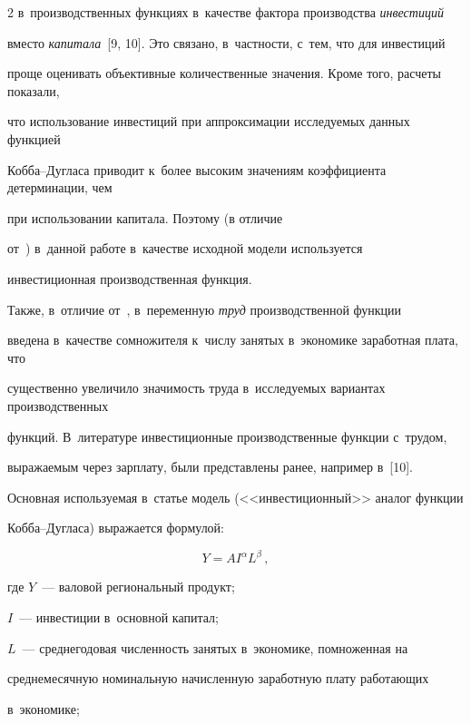 \begin{multicols}{2}
в~производственных функциях в~качестве фактора производства \textit{инвестиций} 


вместо \textit{капитала}~[9, 10]. Это связано, в~част\-ности, с~тем, что для инвестиций 


проще оценивать объективные количественные значения. Кроме того, расчеты показали, 


что использование ин\-вес\-ти\-ций при аппроксимации исследуемых данных функцией 


Коб\-ба--Дуг\-ла\-са приводит к~более высоким значениям коэффициента детерминации, чем 


при использовании капитала. Поэтому (в отличие


 от~\cite{7-ki, 8-ki}) в~данной работе в~качестве исходной модели используется 


инвестиционная производственная функция. 


  


  Также, в~отличие от~\cite{7-ki, 8-ki}, в~переменную \textit{труд} производственной функции 


введена в~качестве сомножителя к~числу занятых в~экономике заработная плата, что 


существенно увеличило значимость труда в~исследуемых вариантах производственных 


функций. В~литературе инвестиционные производственные функции с~трудом, 


выражаемым через зарплату, были представлены ранее, например в~[10].


  


  Основная используемая в~статье модель (<<инвестиционный>> аналог функции 


Коб\-ба--Дуг\-ла\-са) выражается формулой:


  \begin{equation}


  Y=A I^\alpha L^\beta\,,


  \end{equation}


  где $Y$~--- валовой региональный продукт;


  $I$~--- инвестиции в~основной капитал;


  $L$~--- среднегодовая численность занятых в~экономике, помноженная на 


среднемесячную номинальную начисленную заработную плату работающих 


в~экономике; 



\end{multicols}
